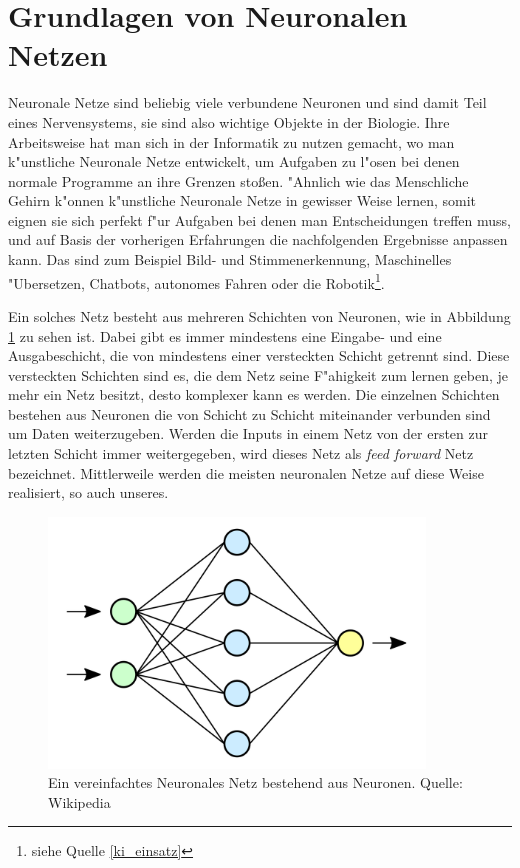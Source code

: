 \documentclass[12pt,a4paper]{scrartcl}
\begin{document}
\section{Grundlagen von Neuronalen Netzen}

Neuronale Netze sind beliebig viele verbundene Neuronen und sind damit Teil eines Nervensystems, sie sind also wichtige Objekte in der Biologie. Ihre Arbeitsweise hat man sich in der Informatik zu nutzen gemacht, wo man k"unstliche Neuronale Netze entwickelt, um Aufgaben zu l"osen bei denen normale Programme an ihre Grenzen sto\ss en. "Ahnlich wie das Menschliche Gehirn k"onnen k"unstliche Neuronale Netze in gewisser Weise lernen, somit eignen sie sich perfekt f"ur Aufgaben bei denen man Entscheidungen treffen muss, und auf Basis der vorherigen Erfahrungen die nachfolgenden Ergebnisse anpassen kann. Das sind zum Beispiel Bild- und Stimmenerkennung, Maschinelles "Ubersetzen, Chatbots, autonomes Fahren oder die Robotik\footnote{siehe Quelle \ref{ki_einsatz}}.\\

\pagebreak

Ein solches Netz besteht aus mehreren Schichten von Neuronen, wie in Abbildung \ref{einfaches_netz} zu sehen ist. Dabei gibt es immer mindestens eine Eingabe- und eine Ausgabeschicht, die von mindestens einer versteckten Schicht getrennt sind. Diese versteckten Schichten sind es, die dem Netz seine F"ahigkeit zum lernen geben, je mehr ein Netz besitzt, desto komplexer kann es werden. Die einzelnen Schichten bestehen aus Neuronen die von Schicht zu Schicht miteinander verbunden sind um Daten weiterzugeben. Werden die Inputs in einem Netz von der ersten zur letzten Schicht immer weitergegeben, wird dieses Netz als \textit{feed forward} Netz bezeichnet. Mittlerweile werden die meisten neuronalen Netze auf diese Weise realisiert, so auch unseres.\\

\begin{figure}[h]
	\centering
	\includegraphics[width=10cm]{screens/neural_net.png}
	\caption{Ein vereinfachtes Neuronales Netz bestehend aus Neuronen. Quelle: Wikipedia} \label{einfaches_netz}
\end{figure}
\end{document}
